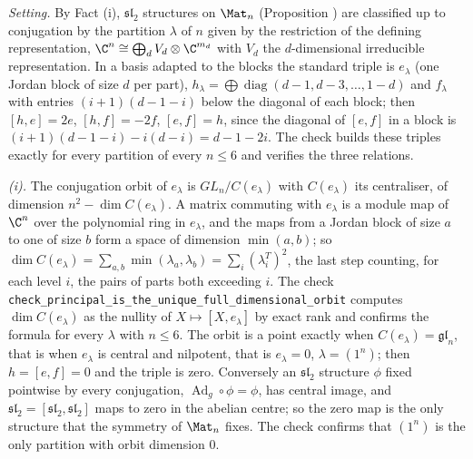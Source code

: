 \emph{Setting.} By Fact (i), $\mathfrak{sl}_2$ structures on $\Mat_n$ (Proposition ) are classified up to conjugation by the partition $\lambda$ of $n$ given by the restriction of the defining representation, $\C^n \cong \bigoplus_d V_d \otimes \C^{m_d}$ with $V_d$ the $d$-dimensional irreducible representation. In a basis adapted to the blocks the standard triple is $e_\lambda$ (one Jordan block of size $d$ per part), $h_\lambda = \bigoplus \operatorname{diag}(d-1, d-3, \dots, 1-d)$ and $f_\lambda$ with entries $(i+1)(d-1-i)$ below the diagonal of each block; then $[h,e] = 2e$, $[h,f] = -2f$, $[e,f] = h$, since the diagonal of $[e,f]$ in a block is $(i+1)(d-1-i) - i(d-i) = d-1-2i$. The check builds these triples exactly for every partition of every $n \leq 6$ and verifies the three relations.

\emph{(i).} The conjugation orbit of $e_\lambda$ is $GL_n/C(e_\lambda)$ with $C(e_\lambda)$ its centraliser, of dimension $n^2 - \dim C(e_\lambda)$. A matrix commuting with $e_\lambda$ is a module map of $\C^n$ over the polynomial ring in $e_\lambda$, and the maps from a Jordan block of size $a$ to one of size $b$ form a space of dimension $\min(a,b)$; so $\dim C(e_\lambda) = \sum_{a,b}\min(\lambda_a, \lambda_b) = \sum_i (\lambda^{T}_i)^2$, the last step counting, for each level $i$, the pairs of parts both exceeding $i$. The check \texttt{check\_principal\_is\_the\_unique\_full\_dimensional\_orbit} computes $\dim C(e_\lambda)$ as the nullity of $X \mapsto [X, e_\lambda]$ by exact rank and confirms the formula for every $\lambda$ with $n \leq 6$. The orbit is a point exactly when $C(e_\lambda) = \mathfrak{gl}_n$, that is when $e_\lambda$ is central and nilpotent, that is $e_\lambda = 0$, $\lambda = (1^n)$; then $h = [e,f] = 0$ and the triple is zero. Conversely an $\mathfrak{sl}_2$ structure $\phi$ fixed pointwise by every conjugation, $\operatorname{Ad}_g \circ \phi = \phi$, has central image, and $\mathfrak{sl}_2 = [\mathfrak{sl}_2, \mathfrak{sl}_2]$ maps to zero in the abelian centre; so the zero map is the only structure that the symmetry of $\Mat_n$ fixes. The check confirms that $(1^n)$ is the only partition with orbit dimension $0$.

